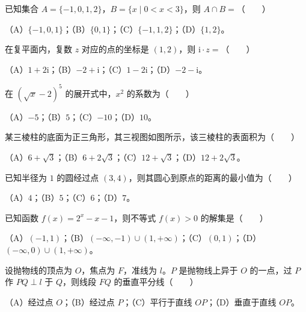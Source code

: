 \begin{question}
已知集合 $A=\{-1,0,1,2\}$，$B=\{x\mid 0<x<3\}$，则 $A\cap B=$\mbox{（　　）}

（A）$\{-1,0,1\}$；（B）$\{0,1\}$；（C）$\{-1,1,2\}$；（D）$\{1,2\}$。

\end{question}
\begin{question}
在复平面内，复数 $z$ 对应的点的坐标是 $(1,2)$，则 $\mathrm i\cdot z=$\mbox{（　　）}

（A）$1+2\mathrm i$；（B）$-2+\mathrm i$；（C）$1-2\mathrm i$；（D）$-2-\mathrm i$。

\end{question}
\begin{question}
在 $(\sqrt x-2)^5$ 的展开式中，$x^2$ 的系数为\mbox{（　　）}

（A）$-5$；（B）$5$；（C）$-10$；（D）$10$。

\Needspace{0.4\textheight}
\end{question}
\begin{question}
某三棱柱的底面为正三角形，其三视图如图所示，该三棱柱的表面积为\mbox{（　　）}

（A）$6+\sqrt3$；（B）$6+2\sqrt3$；（C）$12+\sqrt3$；（D）$12+2\sqrt3$。
\nopagebreak[4]
\begin{center}\end{center}
\nopagebreak[4]
\end{question}
\begin{question}
已知半径为 $1$ 的圆经过点 $(3,4)$，则其圆心到原点的距离的最小值为\mbox{（　　）}

（A）$4$；（B）$5$；（C）$6$；（D）$7$。

\end{question}
\begin{question}
已知函数 $f(x)=2^x-x-1$，则不等式 $f(x)>0$ 的解集是\mbox{（　　）}

（A）$(-1,1)$；（B）$(-\infty,-1)\cup(1,+\infty)$；（C）$(0,1)$；（D）$(-\infty,0)\cup(1,+\infty)$。

\end{question}
\begin{question}
设抛物线的顶点为 $O$，焦点为 $F$，准线为 $l$。$P$ 是抛物线上异于 $O$ 的一点，过 $P$ 作 $PQ\perp l$ 于 $Q$，则线段 $FQ$ 的垂直平分线\mbox{（　　）}

（A）经过点 $O$；（B）经过点 $P$；（C）平行于直线 $OP$；（D）垂直于直线 $OP$。

\end{question}
